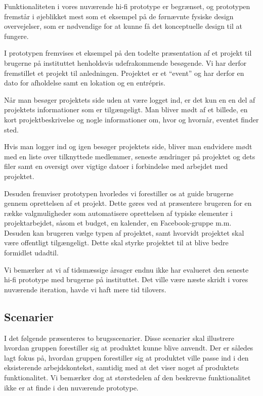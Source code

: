 Funktionaliteten i vores nuværende hi-fi prototype er begrænset, og prototypen fremstår i øjeblikket mest som et eksempel på de førnævnte fysiske design overvejelser, som er nødvendige for at kunne få det konceptuelle design til at fungere.

I prototypen fremvises et eksempel på den todelte præsentation af et projekt til brugerne på instituttet henholdsvis udefrakommende besøgende. Vi har derfor fremstillet et projekt til anledningen. Projektet er et “event” og har derfor en dato for afholdelse samt en lokation og en entrépris.

Når man besøger projektets side uden at være logget ind, er det kun en en del af projektets informationer som er tilgængeligt. Man bliver mødt af et billede, en kort projektbeskrivelse og nogle informationer om, hvor og hvornår, eventet finder sted. 

Hvis man logger ind og igen besøger projektets side, bliver man endvidere mødt med en liste over tilknyttede medlemmer, seneste ændringer på projektet og dets filer samt en oversigt over vigtige datoer i forbindelse med arbejdet med projektet.

Desuden fremviser prototypen hvorledes vi forestiller os at guide brugerne gennem oprettelsen af et projekt. Dette gøres ved at præsentere brugeren for en række valgmuligheder som automatisere oprettelsen af typiske elementer i projektarbejdet, såsom et budget, en kalender, en Facebook-gruppe m.m. Desuden kan brugeren vælge typen af projektet, samt hvorvidt projektet skal være offentligt tilgængeligt. Dette skal styrke projektet til at blive bedre formidlet udadtil.

Vi bemærker at vi af tidsmæssige årsager endnu ikke har evalueret den seneste hi-fi prototype med brugerne på instituttet. Det ville være næste skridt i vores nuværende iteration, havde vi haft mere tid tilovers.

\subsection{Scenarier}
I det følgende præsenteres to brugsscenarier. Disse scenarier skal illustrere hvordan gruppen forestiller sig at produktet kunne blive anvendt. Der er således lagt fokus på, hvordan gruppen forestiller sig at produktet ville passe ind i den eksisterende arbejdskontekst, samtidig med at det viser noget af produktets funktionalitet. Vi bemærker dog at størstedelen af den beskrevne funktionalitet ikke er at finde i den nuværende prototype.

